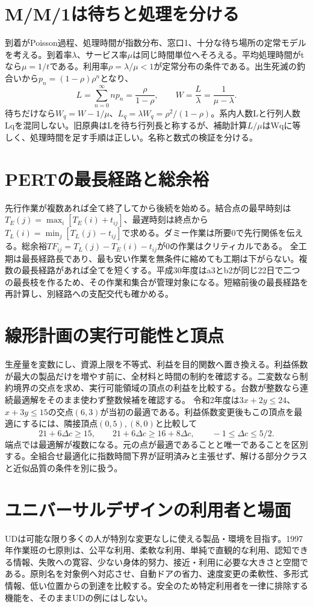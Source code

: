 \section{M/M/1は待ちと処理を分ける}\label{theory:design:queue}
到着がPoisson過程、処理時間が指数分布、窓口1、十分な待ち場所の定常モデルを考える。到着率\(\lambda\)、サービス率\(\mu\)は同じ時間単位へそろえる。平均処理時間がtなら\(\mu=1/t\)である。利用率\(\rho=\lambda/\mu<1\)が定常分布の条件である。出生死滅の釣合いから\(p_n=(1-\rho)\rho^n\)となり、
\[L=\sum_{n=0}^{\infty}np_n=\frac{\rho}{1-\rho},\qquad W=\frac L\lambda=\frac1{\mu-\lambda}.\]
待ちだけなら\(W_q=W-1/\mu\)、\(L_q=\lambda W_q=\rho^2/(1-\rho)\)。系内人数Lと行列人数Lqを混同しない。旧原典はLを待ち行列長と称するが、補助計算\(L/\mu\)はWqに等しく、処理時間を足す手順は正しい。名称と数式の検証を分ける。\cite{design48_queue_ref}
\section{PERTの最長経路と総余裕}\label{theory:design:pert}
先行作業が複数あれば全て終了してから後続を始める。結合点の最早時刻は\(T_E(j)=\max_i[T_E(i)+t_{ij}]\)、最遅時刻は終点から\(T_L(i)=\min_j[T_L(j)-t_{ij}]\)で求める。ダミー作業は所要0で先行関係を伝える。総余裕\(TF_{ij}=T_L(j)-T_E(i)-t_{ij}\)が0の作業はクリティカルである。
全工期は最長経路長であり、最も安い作業を無条件に縮めても工期は下がらない。複数の最長経路があれば全てを短くする。平成30年度はa3とb2が同じ22日で二つの最長枝を作るため、その作業和集合が管理対象になる。短縮前後の最長経路を再計算し、別経路への支配交代も確かめる。
\section{線形計画の実行可能性と頂点}\label{theory:design:lp}
生産量を変数にし、資源上限を不等式、利益を目的関数へ置き換える。利益係数が最大の製品だけを増やす前に、全材料と時間の制約を確認する。二変数なら制約境界の交点を求め、実行可能領域の頂点の利益を比較する。台数が整数なら連続最適解をそのまま使わず整数候補を確認する。
令和2年度は\(3x+2y\le24\)、\(x+3y\le15\)の交点\((6,3)\)が当初の最適である。利益係数変更後もこの頂点を最適にするには、隣接頂点\((0,5),(8,0)\)と比較して
\[21+6\Delta c\ge15,\qquad21+6\Delta c\ge16+8\Delta c,\qquad-1\le\Delta c\le5/2.\]
端点では最適解が複数になる。元の点が最適であることと唯一であることを区別する。全組合せ最適化に指数時間下界が証明済みと主張せず、解ける部分クラスと近似品質の条件を別に扱う。
\section{ユニバーサルデザインの利用者と場面}\label{theory:design:universal}
UDは可能な限り多くの人が特別な変更なしに使える製品・環境を目指す。1997年作業班の七原則は、公平な利用、柔軟な利用、単純で直観的な利用、認知できる情報、失敗への寛容、少ない身体的努力、接近・利用に必要な大きさと空間である。原則名を対象例へ対応させ、自動ドアの省力、速度変更の柔軟性、多形式情報、低い位置からの到達を比較する。安全のため特定利用者を一律に排除する機能を、そのままUDの例にはしない。\cite{design48_ud}
